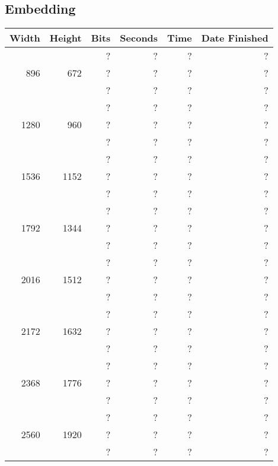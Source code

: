 \subsection{Embedding}
  \begin{center}
  \begin{tabular}{ r r r | r r r }
  Width & Height & Bits & Seconds & Time & Date Finished \\ \hline
  \multirow{3}{*}{896} & \multirow{3}{*}{672} & ? & ? & ? & ? \\
  & & ? & ? & ? & ? \\
  & & ? & ? & ? & ? \\
  \hline
  \multirow{3}{*}{1280} & \multirow{3}{*}{960} & ? & ? & ? & ? \\
  & & ? & ? & ? & ? \\
  & & ? & ? & ? & ? \\
  \hline
  \multirow{3}{*}{1536} & \multirow{3}{*}{1152} & ? & ? & ? & ? \\
  & & ? & ? & ? & ? \\
  & & ? & ? & ? & ? \\
  \hline
  \multirow{3}{*}{1792} & \multirow{3}{*}{1344} & ? & ? & ? & ? \\
  & & ? & ? & ? & ? \\
  & & ? & ? & ? & ? \\
  \hline
  \multirow{3}{*}{2016} & \multirow{3}{*}{1512} & ? & ? & ? & ? \\
  & & ? & ? & ? & ? \\
  & & ? & ? & ? & ? \\
  \hline
  \multirow{3}{*}{2172} & \multirow{3}{*}{1632} & ? & ? & ? & ? \\
  & & ? & ? & ? & ? \\
  & & ? & ? & ? & ? \\
  \hline
  \multirow{3}{*}{2368} & \multirow{3}{*}{1776} & ? & ? & ? & ? \\
  & & ? & ? & ? & ? \\
  & & ? & ? & ? & ? \\
  \hline
  \multirow{3}{*}{2560} & \multirow{3}{*}{1920} & ? & ? & ? & ? \\
  & & ? & ? & ? & ? \\
  & & ? & ? & ? & ? \\
  \end{tabular}
  \end{center}
  
\newpage
